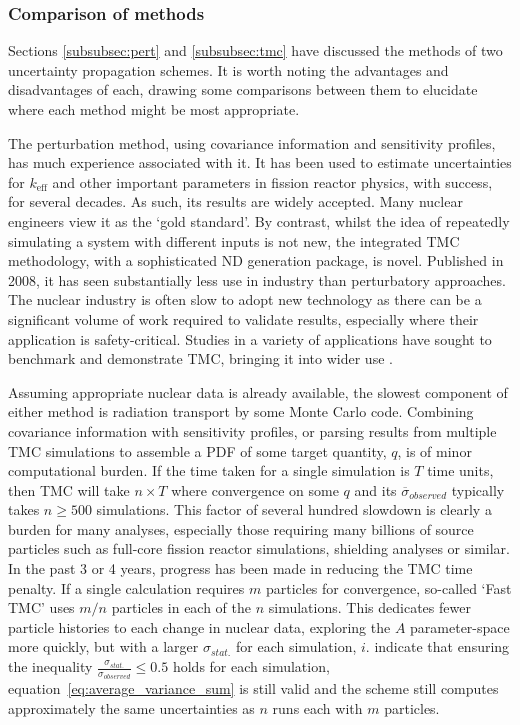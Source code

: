 \FloatBarrier
\subsubsection{Comparison of methods}
Sections \ref{subsubsec:pert} and \ref{subsubsec:tmc} have discussed the methods of two uncertainty propagation schemes. It is worth noting the advantages and disadvantages of each, drawing some comparisons between them to elucidate where each method might be most appropriate.

The perturbation method, using covariance information and sensitivity profiles, has much experience associated with it. It has been used to estimate uncertainties for $k_\mathrm{eff}$ and other important parameters in fission reactor physics, with success, for several decades. As such, its results are widely accepted. Many nuclear engineers view it as the `gold standard'. By contrast, whilst the idea of repeatedly simulating a system with different inputs is not new, the integrated TMC methodology, with a sophisticated ND generation package, is novel. Published in 2008, it has seen substantially less use in industry than perturbatory approaches. The nuclear industry is often slow to adopt new technology as there can be a significant volume of work required to validate results, especially where their application is safety-critical. Studies in a variety of applications have sought to benchmark and demonstrate TMC, bringing it into wider use \cite{Koning2008}\cite{Rochman2010}\cite{Sjostrand2017}\cite{Koning2012}\cite{Alhassan2013}\cite{Alhassan2014}\cite{Rochman2011a}. 

Assuming appropriate nuclear data is already available, the slowest component of either method is radiation transport by some Monte Carlo code. Combining covariance information with sensitivity profiles, or parsing results from multiple TMC simulations to assemble a PDF of some target quantity, $q$, is of minor computational burden. If the time taken for a single simulation is $T$ time units, then TMC will take $n \times T$ where convergence on some $q$ and its $\overline{\sigma}_{observed}$ typically takes $n \geq 500$ simulations\cite{Rochman2014a}. This factor of several hundred slowdown is clearly a burden for many analyses, especially those requiring many billions of source particles such as full-core fission reactor simulations, shielding analyses or similar. In the past 3 or 4 years, progress has been made in reducing the TMC time penalty. If a single calculation requires $m$ particles for convergence, so-called `Fast TMC' uses $m/n$ particles in each of the $n$ simulations. This dedicates fewer particle histories to each change in nuclear data, exploring the $A$ parameter-space more quickly, but with a larger $\sigma_{stat.}$ for each simulation, $i$. \citeauthor{Rochman2014a} indicate that ensuring the inequality $\frac{\sigma_{stat.}}{\sigma_{observed}} \leq 0.5$ holds for each simulation, equation~\ref{eq:average_variance_sum} is still valid and the scheme still computes approximately the same uncertainties as $n$ runs each with $m$ particles.

